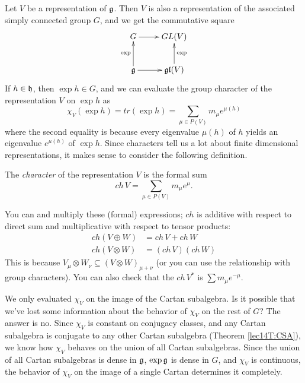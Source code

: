  Let $V$ be a representation of $\mathfrak{g}$. Then $V$ is also a representation of the
 associated simply connected group $G$, and we get the commutative square
 \[\xymatrix{
   G\ar[r] & GL(V)\\
   \g \ar[r] \ar[u]^{\exp} & \gl(V)\ar[u]_{\exp}
 }\]
 If $h\in \mathfrak{h}$, then $\exp h\in G$, and we can evaluate the group character of the
 representation $V$ on $\exp h$ as
 \[
    \chi_V(\exp h) = tr(\exp h) = \sum_{\mu\in P(V)} m_\mu e^{\mu(h)}
 \]
 where the second equality is because every eigenvalue $\mu(h)$ of $h$ yields an
 eigenvalue $e^{\mu(h)}$ of $\exp h$. Since characters tell us a lot about finite
 dimensional representations, it makes sense to consider the following definition.
 \begin{definition}
   The \emph{character} of
   the representation $V$ is the formal sum
   \[
      ch\, V = \sum_{\mu\in P(V)} m_\mu e^\mu.
   \]
 \end{definition}
 You can and multiply these (formal) expressions; $ch$ is additive with respect to
 direct sum and multiplicative with respect to tensor products:
 \begin{align*}
   ch(V\oplus W) &= ch\, V+ch\, W\\
   ch(V\otimes W) &= (ch\, V)(ch\, W)
 \end{align*}
 This is because $V_\mu\otimes W_\nu \subseteq (V\otimes W)_{\mu+\nu}$ (or you can use
 the relationship with group characters). You can also check that the $ch\, V^*$
 is $\sum m_\mu e^{-\mu}$.
 \begin{remark}
   We only evaluated $\chi_V$ on the image of the Cartan subalgebra. Is it possible
   that we've lost some information about the behavior of $\chi_V$ on the rest of $G$?
   The answer is no. Since $\chi_V$ is constant on conjugacy classes, and any Cartan
   subalgebra is conjugate to any other Cartan subalgebra (Theorem \ref{lec14T:CSA}),
   we know how $\chi_V$ behaves on the union of all Cartan subalgebras. Since the
   union of all Cartan subalgebras is dense in $\mathfrak{g}$, $\exp \mathfrak{g}$ is dense in
   $G$,
   and $\chi_V$ is continuous, the behavior of $\chi_V$ on the image of a single
   Cartan determines it completely.
 \end{remark}
